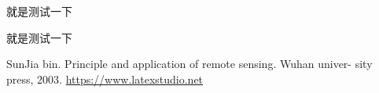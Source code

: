 \documentclass{ctexart}
\begin{document}
%
%

\par 就是测试一下\cite{RSfund}
\par 就是测试一下 \cite{LaTeXnet}

\begin{thebibliography}{99}
		\newblock 
	SunJia bin. 
	\newblock  Principle and application of remote sensing. Wuhan univer- sity press, 2003.
	   \url{https://www.latexstudio.net}
\end{thebibliography}
\end{document}
